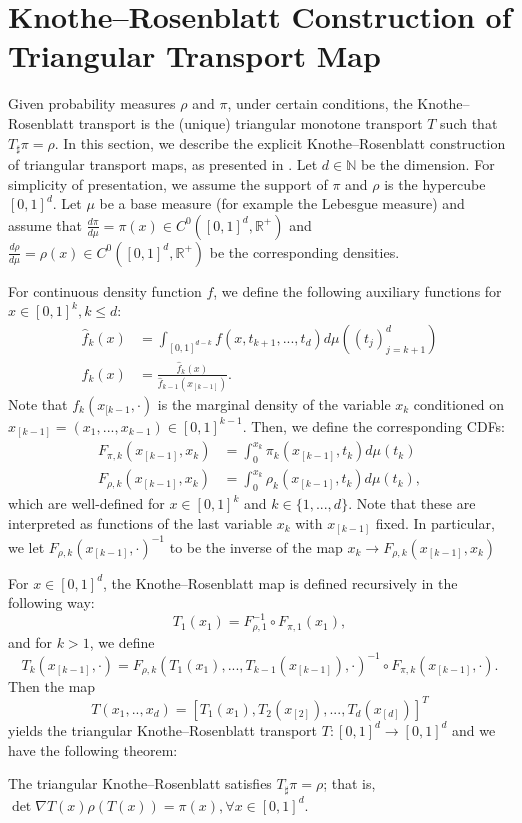 \section{Knothe--Rosenblatt Construction of Triangular Transport Map}\label{app:KRMap}	
Given probability measures $\rho$ and $\pi$, under certain conditions, the Knothe–Rosenblatt transport is the (unique) triangular monotone transport $T$ such that $T_\sharp\pi = \rho$. In this section, we describe the explicit Knothe--Rosenblatt construction of triangular transport maps, as presented in \cite{OTAppliedMathematician}. Let $d\in\mathbb{N}$ be the dimension. For simplicity of presentation, we assume the support of $\pi$ and $\rho$ is the hypercube $[0,1]^d$. Let $\mu$ be a base measure (for example the Lebesgue measure) and assume that $\frac{d\pi}{d\mu} = \pi(x)\in C^0([0,1]^d, \mathbb{R}^+)$ and $\frac{d\rho}{d\mu} = \rho(x)\in C^0([0,1]^d, \mathbb{R}^+)$ be the corresponding densities. 

For continuous density function $f$, we define the following auxiliary functions for $x\in[0,1]^k, k\leq d$:
\begin{equation}
\begin{aligned}
\hat{f}_k(x) &= \int_{[0,1]^{d-k}}f(x, t_{k+1},...,t_d)d\mu((t_j)_{j=k+1}^d)\\
f_k(x) &= \frac{\hat{f}_k(x)}{\hat{f}_{k-1}(x_{[k-1]})}.
\end{aligned}
\end{equation}
Note that $f_k(x_{[k-1}, \cdot)$ is the marginal density of the variable $x_k$ conditioned on $x_{[k-1]} = (x_1,...,x_{k-1})\in[0,1]^{k-1}$. Then, we define the corresponding CDFs:
\begin{equation}
\begin{aligned}
F_{\pi,k}(x_{[k-1]}, x_k) &= \int_{0}^{x_k}\pi_k(x_{[k-1]}, t_{k})d\mu(t_k)\\
F_{\rho,k}(x_{[k-1]}, x_k) &= \int_{0}^{x_k}\rho_k(x_{[k-1]}, t_{k})d\mu(t_k),
\end{aligned}
\end{equation}
which are well-defined for $x\in[0,1]^k$ and $k\in\{1,...,d\}$. Note that these are interpreted as functions of the last variable $x_k$ with $x_{[k-1]}$ fixed. In particular, we let $F_{\rho,k}(x_{[k-1]}, \cdot)^{-1}$ to be the inverse of the map $x_k\rightarrow F_{\rho,k}(x_{[k-1]}, x_k)$

For $x \in [0,1]^d$, the Knothe--Rosenblatt map is defined recursively in the following way:
$$T_1(x_1) = F_{\rho,1}^{-1}\circ F_{\pi,1}(x_1),$$
and for $k > 1$, we define
$$T_k(x_{[k-1]}, \cdot) = F_{\rho,k}(T_1(x_1),...,T_{k-1}(x_{[k-1]}), \cdot)^{-1}\circ F_{\pi,k}(x_{[k-1]}, \cdot).$$
Then the map $$T(x_1,..,x_d) = [T_1(x_1), T_2(x_{[2]}),...,T_d(x_{[d]})]^T$$
yields the triangular Knothe–Rosenblatt transport $T:[0,1]^d\rightarrow[0,1]^d$ and we have the following theorem:
\begin{theorem}
The triangular Knothe–Rosenblatt satisfies $T_\sharp\pi = \rho$; that is, $\det\nabla T(x)\rho(T(x)) = \pi(x), \forall x\in[0,1]^d$.
\end{theorem}
	
	
	
	
	
	


